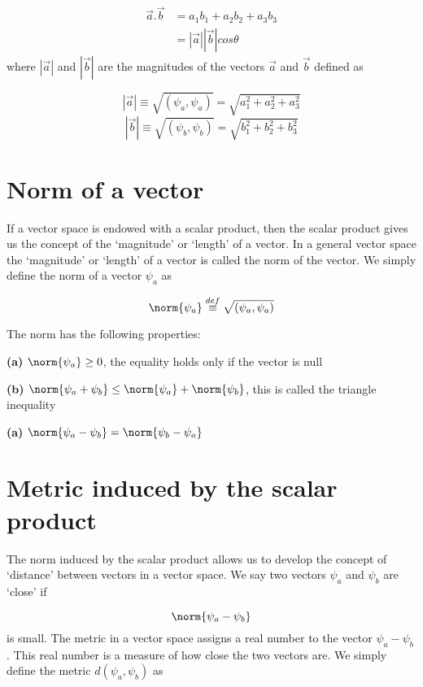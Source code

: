 \begin{align*}
\vec{a}.\vec{b} &= a_1 b_1 + a_2 b_2 + a_3 b_3 \\
               &= |\vec{a}| |\vec{b}| cos \theta
\end{align*}
where $|\vec{a}|$ and $|\vec{b}|$ are the magnitudes of the vectors $\vec{a}$ and $\vec{b}$ defined as

$$|\vec{a}| \equiv \sqrt{(\psi_a,\psi_a)} = \sqrt{a_1^2 + a_2^2 + a_3^2}$$
$$|\vec{b}| \equiv \sqrt{(\psi_b,\psi_b)} = \sqrt{b_1^2 + b_2^2 + b_3^2}$$


\section{Norm of a vector}

If a vector space is endowed with a scalar product, then the scalar product gives us the concept of the `magnitude' or `length' of a vector. In a general vector space the `magnitude' or `length' of a vector is called the norm of the vector. We simply define the norm of a vector $\psi_a$ as

$$\norm{\psi_a} \stackrel{def}{\equiv} \sqrt{(\psi_a,\psi_a)} $$

\begin{flushleft}
The norm has the following properties:
\end{flushleft}

\begin{description}
\item {\bf (a)} $\norm{\psi_a} \geq 0$, the equality holds only if the vector is null
\item {\bf (b)} $\norm{\psi_a + \psi_b} \leq \norm{\psi_a} + \norm{\psi_b}$, this is called the triangle inequality
\item {\bf (a)} $\norm{\psi_a - \psi_b} = \norm{\psi_b - \psi_a}$
\end{description}


\section{Metric induced by the scalar product}

The norm induced by the scalar product allows us to develop the concept of `distance' between vectors in a vector space. We say two vectors $\psi_a$ and $\psi_b$ are `close' if

$$\norm{\psi_a - \psi_b}$$
is small. The metric in a vector space assigns a real number to the vector $\psi_a - \psi_b$. This real number is a measure of how close the two vectors are. We simply define the metric $d(\psi_a,\psi_b)$ as

